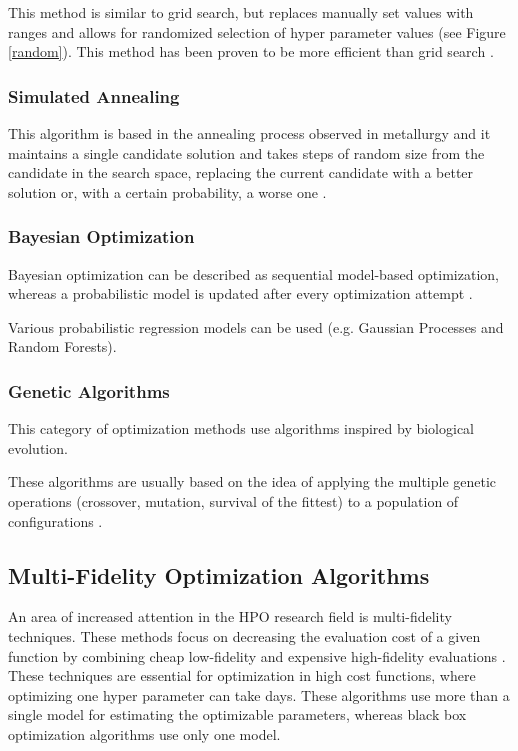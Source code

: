 \documentclass[runningheads]{llncs}
\begin{document}
This method is similar to grid search, but replaces manually set values with ranges and allows for randomized selection of hyper parameter values (see Figure \ref{random}). This method has been proven to be more efficient than grid search \cite{JMLR:v13:bergstra12a}.

\subsubsection{Simulated Annealing}

This algorithm is based in the annealing process observed in metallurgy and it maintains a single candidate solution and takes steps of random size from the candidate in the search space, replacing the current candidate with a better solution or, with a certain probability, a worse one \cite{elshawi2019automated}.

\subsubsection{Bayesian Optimization}

Bayesian optimization can be described as sequential model-based optimization, whereas a probabilistic model is updated after every optimization attempt \cite{dewancker}.

Various probabilistic regression models can be used (e.g. Gaussian Processes and Random Forests).

\subsubsection{Genetic Algorithms}

This category of optimization methods use algorithms inspired by biological evolution.

These algorithms are usually based on the idea of applying the multiple genetic operations (crossover, mutation, survival of the fittest) to a population of configurations \cite{elshawi2019automated}.

\subsection{Multi-Fidelity Optimization Algorithms}

An area of increased attention in the HPO research field is multi-fidelity techniques. These methods focus on decreasing the evaluation cost of a given function by combining cheap low-fidelity and expensive high-fidelity evaluations \cite{elshawi2019automated}. These techniques are essential for optimization in high cost functions, where optimizing one hyper parameter can take days. These algorithms use more than a single model for estimating the optimizable parameters, whereas black box optimization algorithms use only one model.
\end{document}
